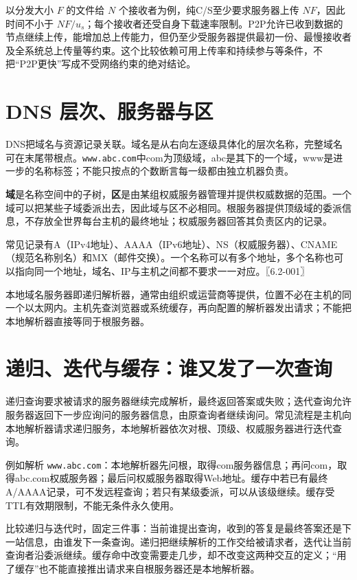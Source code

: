 以分发大小 \(F\) 的文件给 \(N\) 个接收者为例，纯C/S至少要求服务器上传 \(NF\)，因此时间不小于 \(NF/u_s\)；每个接收者还受自身下载速率限制。P2P允许已收到数据的节点继续上传，能增加总上传能力，但仍至少受服务器提供最初一份、最慢接收者及全系统总上传量等约束。这个比较依赖可用上传率和持续参与等条件，不把``P2P更快''写成不受网络约束的绝对结论。

\section{DNS 层次、服务器与区}\label{cn-06-02}

DNS把域名与资源记录关联。域名是从右向左逐级具体化的层次名称，完整域名可在末尾带根点。\allowbreak{}\texttt{www.abc.com}中com为顶级域，abc是其下的一个域，www是进一步的名称标签；不能只按点的个数断言每一级都由独立机器负责。

\textbf{域}是名称空间中的子树，\textbf{区}是由某组权威服务器管理并提供权威数据的范围。一个域可以把某些子域委派出去，因此域与区不必相同。根服务器提供顶级域的委派信息，不存放全世界每台主机的最终地址；权威服务器回答其负责区内的记录。

常见记录有A（IPv4地址）、AAAA（IPv6地址）、NS（权威服务器）、CNAME（规范名称别名）和MX（邮件交换）。一个名称可以有多个地址，多个名称也可以指向同一个地址，域名、IP与主机之间都不要求一一对应。〖6.2-001〗

本地域名服务器即递归解析器，通常由组织或运营商等提供，位置不必在主机的同一个以太网内。主机先查浏览器或系统缓存，再向配置的解析器发出请求；不能把本地解析器直接等同于根服务器。

\section{递归、迭代与缓存：谁又发了一次查询}\label{cn-06-03}

递归查询要求被请求的服务器继续完成解析，最终返回答案或失败；迭代查询允许服务器返回下一步应询问的服务器信息，由原查询者继续询问。常见流程是主机向本地解析器请求递归服务，本地解析器依次对根、顶级、权威服务器进行迭代查询。

例如解析 \allowbreak{}\texttt{www.abc.com}：本地解析器先问根，取得com服务器信息；再问com，取得abc.com权威服务器；最后问权威服务器取得Web地址。缓存中若已有最终A/AAAA记录，可不发远程查询；若只有某级委派，可以从该级继续。缓存受TTL有效期限制，不能无条件永久使用。

比较递归与迭代时，固定三件事：当前谁提出查询，收到的答复是最终答案还是下一站信息，由谁发下一条查询。递归把继续解析的工作交给被请求者，迭代让当前查询者沿委派继续。缓存命中改变需要走几步，却不改变这两种交互的定义；``用了缓存''也不能直接推出请求来自根服务器还是本地解析器。

